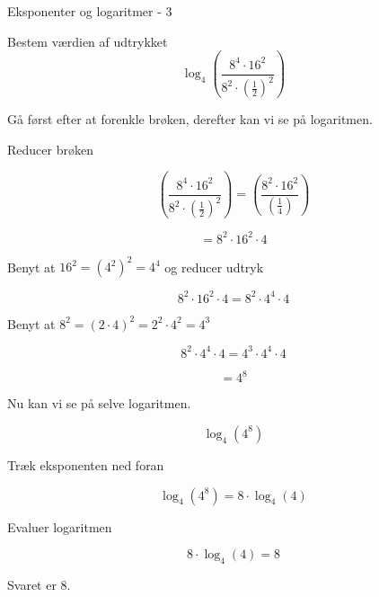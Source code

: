 \documentclass{article}
\begin{document}
\begin{exercise}{Eksponenter og logaritmer - 3}
	
	Bestem værdien af udtrykket
	\[
	\log_4\left(\frac{8^4 \cdot 16^2}{8^2 \cdot \left(\frac{1}{2} \right)^2} \right)
	\]
	
	
	\hint
	Gå først efter at forenkle brøken, derefter kan vi se på logaritmen.
	
	\hint
	Reducer brøken 
	
	\hint
	\[
	\left(\frac{8^4 \cdot 16^2}{8^2 \cdot \left(\frac{1}{2} \right)^2} \right) = \left(\frac{8^2 \cdot 16^2}{ \left(\frac{1}{4} \right)} \right)
	\]
	
	\hint
	\[
	= 8^2 \cdot 16^2 \cdot 4
	\]
	
	\hint
	Benyt at $16^2=(4^2)^2 = 4^4$ og reducer udtryk
	
	\hint
	\[
	8^2 \cdot 16^2 \cdot 4 = 8^2 \cdot 4^4 \cdot 4 	
	\]
	
	\hint
	Benyt at $8^2 = (2 \cdot 4)^2 = 2^2 \cdot 4^2 = 4^3$
	
	\hint
	\[
	8^2 \cdot 4^4 \cdot 4 = 4^3 \cdot 4^4 \cdot 4
	\]
	
	\hint
	\[
	= 4^8
	\]
		
	\hint
	Nu kan vi se på selve logaritmen.
	
	\hint
	\[
	\log_4\left(4^8\right)
	\]
	
	
	\hint
	Træk eksponenten ned foran
	
	\hint
	\[
	\log_4\left(4^{8}\right) = 8 \cdot \log_4(4)
	\]
	
	\hint
	Evaluer logaritmen
	
	\hint
	\[
	8 \cdot \log_4(4) = 8
	\]
	
	\hint
	Svaret er $8$.
	
\end{exercise}
\end{document}

